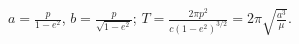 $a=\frac{p}{1-e^2}$, $b=\frac{p}{\sqrt{1-e^2}}$; $T=\frac{2\pi p^2}{c(1-e^2)^{3/2}}=2\pi \sqrt{\frac{a^3}{\mu}}$.
